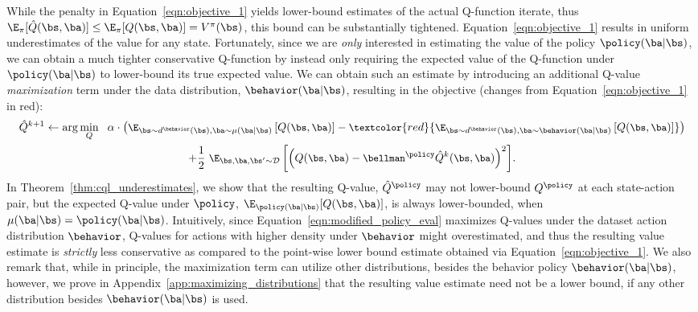 While the penalty in Equation~\ref{eqn:objective_1} yields lower-bound estimates of the actual Q-function iterate, thus  
$\E_{\pi}[\hat{Q}(\bs, \ba)] \leq \E_{\pi}[Q(\bs, \ba) ] = V^\pi(\bs)$, 
this bound can be substantially tightened. Equation~\ref{eqn:objective_1} results in uniform underestimates of the value for any state.
Fortunately, since we are \textit{only} interested in estimating the value of the policy $\policy(\ba|\bs)$, we can obtain a much tighter conservative Q-function by instead only requiring the expected value of the Q-function under $\policy(\ba|\bs)$ to lower-bound its true expected value. We can obtain such an estimate by introducing an additional Q-value \textit{maximization} term under the data distribution, $\behavior(\ba|\bs)$, resulting in the objective (changes from Equation~\ref{eqn:objective_1} in red):
\begin{multline}
    \small{\hat{Q}^{k+1} \leftarrow \arg\min_{Q}~~ \alpha \cdot \left(\E_{\bs \sim d^\behavior(\bs), \ba \sim \mu(\ba|\bs)}\left[Q(\bs, \ba)\right] - \textcolor{red}{\E_{\bs \sim d^\behavior(\bs), \ba \sim \behavior(\ba|\bs)}\left[Q(\bs, \ba)\right]} \right)} \\
    \small{+ \frac{1}{2}~ \E_{\bs, \ba, \bs' \sim \mathcal{D}}\left[\left(Q(\bs, \ba) - \bellman^\policy \hat{Q}^{k} (\bs, \ba) \right)^2 \right]}.
    \label{eqn:modified_policy_eval}
\end{multline}
In Theorem~\ref{thm:cql_underestimates}, we show that the resulting Q-value, 
$\hat{Q}^{\policy}$ may not lower-bound ${Q}^\policy$ at each state-action pair, but the expected Q-value under $\policy$, $\E_{\policy(\ba|\bs)}[Q(\bs, \ba)]$,
is always lower-bounded, when $\mu(\ba|\bs) = \policy(\ba|\bs)$. Intuitively, since Equation~\ref{eqn:modified_policy_eval} maximizes Q-values under the dataset action distribution $\behavior$, Q-values for actions with higher density under $\behavior$ might overestimated, and thus the resulting value estimate is \textit{strictly} less conservative as compared to the point-wise lower bound estimate obtained via Equation~\ref{eqn:objective_1}. We also remark that, while in principle, the maximization term can utilize other distributions, besides the behavior policy $\behavior(\ba|\bs)$, however, we prove in Appendix~\ref{app:maximizing_distributions} that the resulting value estimate need not be a lower bound, if any other distribution besides $\behavior(\ba|\bs)$ is used.


